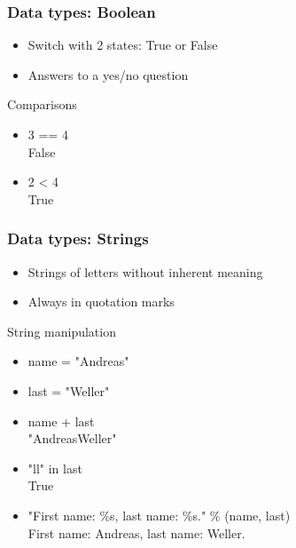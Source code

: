\documentclass[]{beamer}
\begin{document}


\begin{frame}
\frametitle{Data types: Boolean}

\begin{itemize}
\item Switch with 2 states: True or False
\item Answers to a yes/no question
\end{itemize}
\vspace{1cm}
\pause

\begin{block}{Comparisons}
\begin{itemize}
\item 3 == 4
\\False 
\item 2 < 4
\\True
\end{itemize}
\end{block}

\end{frame}


\begin{frame}
\frametitle{Data types: Strings}

\begin{itemize}
\item Strings of letters without inherent meaning
\item Always in quotation marks
\end{itemize}

\pause

\begin{block}{String manipulation}
\begin{itemize}
\item name = "Andreas"
\item last = "Weller"
\item name + last
\\ "AndreasWeller"
\item "ll" in last \\
True
\item "First name: \%s, last name: \%s." \% (name, last) \\
First name: Andreas, last name: Weller.
\end{itemize}
\end{block}

\end{frame}
\end{document}
